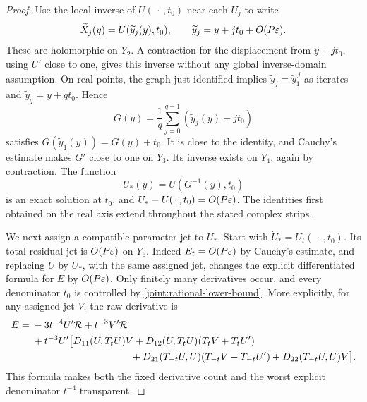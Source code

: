 \begin{proof}
Use the local inverse of \(U(\,\cdot\,,t_0)\) near each \(U_j\) to write
\[
 \widetilde X_j(y)=U(\widetilde y_j(y),t_0),\qquad
 \widetilde y_j=y+jt_0+O(P\varepsilon).
\]
These are holomorphic on \(Y_2\). A contraction for the displacement
from \(y+jt_0\), using \(U'\) close to one, gives this inverse without
any global inverse-domain assumption. On real points, the graph just
identified implies
\(\widetilde y_j=\widetilde y_1^{\,j}\) as iterates and
\(\widetilde y_q=y+qt_0\). Hence
\[
 G(y)=\frac1q\sum_{j=0}^{q-1}(\widetilde y_j(y)-jt_0)
\]
satisfies \(G(\widetilde y_1(y))=G(y)+t_0\). It is close to the identity,
and Cauchy's estimate makes \(G'\) close to one on \(Y_3\). Its inverse
exists on \(Y_4\), again by contraction. The function
\begin{equation}
 U_*(y)=U(G^{-1}(y),t_0)
 \label{joint:exact-rational-parametrization}
\end{equation}
is an exact solution at \(t_0\), and
\(U_*-U(\,\cdot\,,t_0)=O(P\varepsilon)\). The identities first obtained on
the real axis extend throughout the stated complex strips.

We next assign a compatible parameter jet to \(U_*\). Start with
\(\dot U_*=U_t(\,\cdot\,,t_0)\). Its total residual jet is
\(O(P\varepsilon)\) on \(Y_6\). Indeed \(E_t=O(P\varepsilon)\) by Cauchy's
estimate, and replacing \(U\) by \(U_*\), with the same assigned jet,
changes the explicit differentiated formula for \(E\) by
\(O(P\varepsilon)\). Only finitely many derivatives occur, and every
denominator \(t_0\) is controlled by \eqref{joint:rational-lower-bound}.
More explicitly, for any assigned jet \(V\), the raw derivative is
\begin{align}
 \dot E={}&-3t^{-4}U'\mathcal R+t^{-3}V'\mathcal R\notag\\
 &+t^{-3}U'\bigl[
 D_{11}(U,T_tU)V
 +D_{12}(U,T_tU)(T_tV+T_tU')\notag\\
 &\hspace{35mm}
 +D_{21}(T_{-t}U,U)(T_{-t}V-T_{-t}U')
 +D_{22}(T_{-t}U,U)V\bigr].
 \label{joint:raw-parameter-derivative}
\end{align}
This formula makes both the fixed derivative count and the worst
explicit denominator \(t^{-4}\) transparent.


\end{proof}
